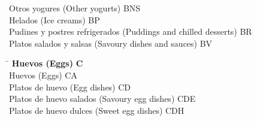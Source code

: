 \begin{small}
\begin{tabbing}
                \hspace{1cm}Otros yogures (Other yogurts) \> BNS \\
            \hspace{0.5cm}Helados (Ice creams) \> BP \\
            \hspace{0.5cm}Pudines y postres refrigerados (Puddings and chilled desserts) \> BR \\
            \hspace{0.5cm}Platos salados y salsas (Savoury dishes and sauces) \> BV \\
    \end{tabbing}

    \vspace{-1.25cm}
\newpage
    \begin{tabbing}
    \hspace{15cm} \= \hspace{0cm} \kill
        \textbf{Huevos (Eggs)} \> \textbf{C} \\
            \hspace{0.5cm}Huevos (Eggs) \> CA \\
            \hspace{0.5cm}Platos de huevo (Egg dishes) \> CD \\
                \hspace{1cm}Platos de huevo salados (Savoury egg dishes) \> CDE \\
                \hspace{1cm}Platos de huevo dulces (Sweet egg dishes) \> CDH \\
    \end{tabbing}
    
    \vspace{-1.25cm}
    

\end{small}
